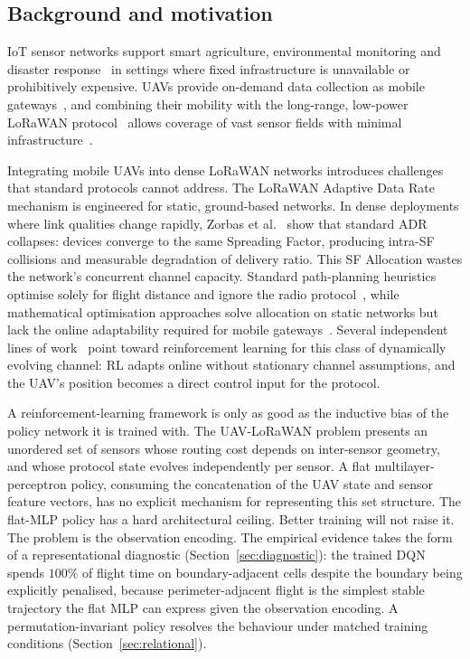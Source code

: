 \subsection{Background and motivation}
IoT sensor networks support smart agriculture, environmental
monitoring and disaster response~\cite{wei2022uav} in settings
where fixed infrastructure is unavailable or prohibitively expensive.
UAVs provide on-demand data collection as mobile
gateways~\cite{wei2022uav,mozaffari2019tutorial,zeng2016wireless},
and combining their mobility with the long-range, low-power LoRaWAN
protocol~\cite{augustin2016lora,bor2016lora} allows coverage of vast
sensor fields with minimal infrastructure~\cite{nakamura2022lora}.

Integrating mobile UAVs into dense LoRaWAN networks introduces
challenges that standard protocols cannot address. The LoRaWAN
Adaptive Data Rate mechanism is engineered for static,
ground-based networks. In dense deployments where link qualities
change rapidly, Zorbas et al.~\cite{zorbas2025revisiting} show that
standard ADR collapses: devices converge to the same Spreading
Factor, producing intra-SF collisions and measurable degradation of
delivery ratio. This SF Allocation wastes the network's concurrent
channel capacity. Standard path-planning heuristics optimise solely
for flight distance and ignore the radio
protocol~\cite{xiong2023flyinglora}, while mathematical optimisation
approaches solve allocation on static networks but lack the online
adaptability required for mobile
gateways~\cite{zorbas2025revisiting}. Several independent lines of work~\cite{zorbas2025revisiting,nguyen20226g,luong2019drl,challita2018interference}
point toward reinforcement learning for this class of dynamically
evolving channel: RL adapts online without stationary channel
assumptions, and the UAV's position becomes a direct control input
for the protocol.

A reinforcement-learning framework is only as good as the inductive
bias of the policy network it is trained with. The UAV-LoRaWAN
problem presents an unordered set of sensors whose routing cost
depends on inter-sensor geometry, and whose protocol state evolves
independently per sensor. A flat multilayer-perceptron policy,
consuming the concatenation of the UAV state and sensor feature
vectors, has no explicit mechanism for representing this set
structure. The flat-MLP policy has a hard architectural ceiling. Better training will not raise it. The problem is the observation encoding.
The empirical evidence takes the form of a representational
diagnostic (Section~\ref{sec:diagnostic}): the trained DQN spends
$100\%$ of flight time on boundary-adjacent cells despite the
boundary being explicitly penalised, because perimeter-adjacent
flight is the simplest stable trajectory the flat MLP can express
given the observation encoding. A permutation-invariant policy
resolves the behaviour under matched training conditions
(Section~\ref{sec:relational}).
